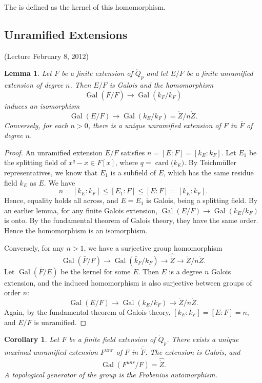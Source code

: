 \documentclass{amsart}
\newtheorem{lemma}[equation]{Lemma}
\newtheorem{corollary}[equation]{Corollary}
\def\card#1{\op{card}{#1}}
\def\op#1{{\operatorname{#1}}}
\def\oG{\op{Gal}}
\begin{document}
The  is defined as the kernel of this homomorphism.


\subsection{Unramified Extensions}


(Lecture February 8, 2012)


\begin{lemma}
  Let $F$ be a finite extension of $\ring{Q}_p$ and let $E/F$ be a
  finite unramified extension of degree $n$. Then $E/F$ is Galois and
  the homomorphism
\[
\oG(\bar{{F}}/F)\to\oG(\bar{k_F}/k_F)
\]
induces an isomorphism
\[
\oG(E/F) \to \oG(k_E/k_F) = \ring{Z}/n\ring{Z}.
\]
Conversely, for each $n>0$, there is a unique unramified extension of $F$ in $\bar F$
of degree $n$.
\end{lemma}

\begin{proof} An unramified extension $E/F$ satisfies $n=[E:F]=[k_E:k_F]$.
Let $E_1$ be the splitting field of $x^q - x \in F[x]$, where $q = \card(k_E)$.
By Teichm\"uller representatives, we know that $E_1$ is a subfield of $E$, which
has the same residue field $k_E$ as $E$.  We have
\[
n = [k_E:k_F] \le [E_1:F] \le [E:F] = [k_E:k_F].
\]
Hence, equality holds all across, and $E=E_1$ is Galois, being a splitting field.
By an earlier lemma, for any finite Galois extension, $\oG(E/F)\to\oG(k_E/k_F)$
is onto.  By the fundamental theorem of Galois theory, they have the same order.
Hence the homomorphism is an isomorphism.

Conversely, for any $n>1$, we have a surjective group homomorphism
\[
\oG(\bar{F}/F)\to \oG(\bar{k}_F/k_F) \to\hat{\ring{Z}}\to \ring{Z}/n\ring{Z}.
\]
Let $\oG(\bar{F}/E)$ be the kernel for some $E$.  Then $E$ is a degree $n$
Galois extension, and the induced homomorphism is also surjective between groups
of order $n$:
\[
\oG(E/F) \to \oG(k_E/k_F)\to \ring{Z}/n\ring{Z}.
\]
Again, by the fundamental theorem of Galois theory, $[k_E:k_F]=[E:F]=n$,
and $E/F$ is unramified.
\end{proof}

\begin{corollary} Let $F$ be a finite field extension of $\ring{Q}_p$.
  There exists a unique maximal unramified extension $F^{unr}$ of $F$
  in $\bar{\ring{F}}$.  The extension is Galois, and
\[
\oG(F^{unr}/F) = \hat{\ring{Z}}.
\]
A topological generator of the group is the Frobenius automorphism.
\end{corollary}
\end{document}

